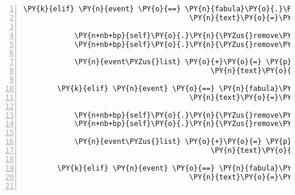 \begin{Verbatim}[commandchars=\\\{\},numbers=left,firstnumber=1,stepnumber=1]
        \PY{k}{elif} \PY{n}{event} \PY{o}{==} \PY{n}{fabula}\PY{o}{.}\PY{n}{SaysEvent}\PY{p}{(}\PY{n}{identifier}\PY{o}{=}\PY{n}{ID\PYZus{}KUNI}\PY{p}{,}
                                       \PY{n}{text}\PY{o}{=}\PY{l+s}{\PYZsq{}}\PY{l+s}{Wer bist du?}\PY{l+s}{\PYZsq{}}\PY{p}{)}\PY{p}{:}

            \PY{n+nb+bp}{self}\PY{o}{.}\PY{n}{\PYZus{}remove\PYZus{}sentence}\PY{p}{(}\PY{n}{ID\PYZus{}KUNI}\PY{p}{,} \PY{n}{event}\PY{o}{.}\PY{n}{text}\PY{p}{)}
            \PY{n+nb+bp}{self}\PY{o}{.}\PY{n}{\PYZus{}remove\PYZus{}sentence}\PY{p}{(}\PY{n}{ID\PYZus{}CASSANDRA}\PY{p}{,} \PY{l+s}{\PYZsq{}}\PY{l+s}{Guten Tag, ich bin die Fee Cassandra.}\PY{l+s}{\PYZsq{}}\PY{p}{)}

            \PY{n}{event\PYZus{}list} \PY{o}{+}\PY{o}{=} \PY{p}{[}\PY{n}{fabula}\PY{o}{.}\PY{n}{SaysEvent}\PY{p}{(}\PY{n}{identifier}\PY{o}{=}\PY{n}{ID\PYZus{}CASSANDRA}\PY{p}{,}
                                            \PY{n}{text}\PY{o}{=}\PY{l+s}{\PYZsq{}}\PY{l+s}{Guten Tag, ich bin die Fee Cassandra.}\PY{l+s}{\PYZsq{}}\PY{p}{)}\PY{p}{]}

        \PY{k}{elif} \PY{n}{event} \PY{o}{==} \PY{n}{fabula}\PY{o}{.}\PY{n}{SaysEvent}\PY{p}{(}\PY{n}{identifier}\PY{o}{=}\PY{n}{ID\PYZus{}CASSANDRA}\PY{p}{,}
                                       \PY{n}{text}\PY{o}{=}\PY{l+s}{\PYZsq{}}\PY{l+s}{Guten Tag, ich bin die Fee Cassandra.}\PY{l+s}{\PYZsq{}}\PY{p}{)}\PY{p}{:}

            \PY{n+nb+bp}{self}\PY{o}{.}\PY{n}{\PYZus{}remove\PYZus{}sentence}\PY{p}{(}\PY{n}{ID\PYZus{}CASSANDRA}\PY{p}{,} \PY{l+s}{\PYZsq{}}\PY{l+s}{Guten Tag, ich bin die Fee Cassandra.}\PY{l+s}{\PYZsq{}}\PY{p}{)}
            \PY{n+nb+bp}{self}\PY{o}{.}\PY{n}{\PYZus{}remove\PYZus{}sentence}\PY{p}{(}\PY{n}{ID\PYZus{}KUNI}\PY{p}{,} \PY{l+s}{\PYZsq{}}\PY{l+s}{Wer bist du?}\PY{l+s}{\PYZsq{}}\PY{p}{)}

            \PY{n}{event\PYZus{}list} \PY{o}{+}\PY{o}{=} \PY{p}{[}\PY{n}{fabula}\PY{o}{.}\PY{n}{SaysEvent}\PY{p}{(}\PY{n}{identifier}\PY{o}{=}\PY{n}{ID\PYZus{}KUNI}\PY{p}{,}
                                            \PY{n}{text}\PY{o}{=}\PY{l+s}{\PYZsq{}}\PY{l+s}{Angenehm!}\PY{l+s}{\PYZsq{}}\PY{p}{)}\PY{p}{]}

        \PY{k}{elif} \PY{n}{event} \PY{o}{==} \PY{n}{fabula}\PY{o}{.}\PY{n}{SaysEvent}\PY{p}{(}\PY{n}{identifier}\PY{o}{=}\PY{n}{ID\PYZus{}CASSANDRA}\PY{p}{,}
                                       \PY{n}{text}\PY{o}{=}\PY{l+s}{\PYZsq{}}\PY{l+s}{Mit wem habe ich die Ehre?}\PY{l+s}{\PYZsq{}}\PY{p}{)}\PY{p}{:}


\end{Verbatim}
